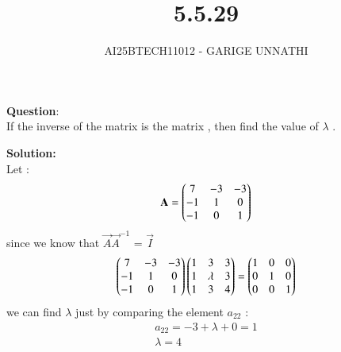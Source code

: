 \documentclass[journal]{IEEEtran}
\begin{document}



\title{5.5.29}
\author{AI25BTECH11012 - GARIGE UNNATHI}
{\let\newpage\relax\maketitle}


\renewcommand{\thefigure}{\theenumi}
\renewcommand{\thetable}{\theenumi}
\setlength{\intextsep}{10pt} %



\vspace{-1cm}

\textbf{Question}:\\
If the inverse of the matrix is the matrix  , then find the value of $\lambda$ .


\textbf{Solution: }\\
Let : 
\begin{align*}
    \mathbf{A}  = \begin{pmatrix}7 &-3&-3\\
                      -1&1&0\\
                      -1&0&1\end{pmatrix}
\end{align*}
since we know that $\vec{A}$$\vec{A}^{-1}$ = $\vec{I}$
\begin{align}
  \begin{pmatrix}7 &-3&-3\\
          -1&1&0\\
          -1&0&1\end{pmatrix} \begin{pmatrix}1&3&3\\1&\lambda&3\\1&3&4\end{pmatrix} = \begin{pmatrix}1&0&0\\0&1&0\\0&0&1\end{pmatrix}
\end{align}
we can find $\lambda$ just by comparing the  element $a_{22}$ :
\begin{align}
 a_{22} = -3 + \lambda + 0  = 1\\
 \lambda = 4
\end{align}
\end{document}
